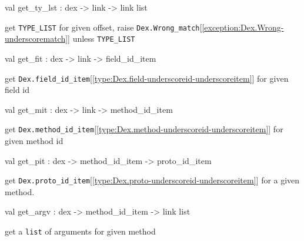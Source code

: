 \documentclass[11pt]{article}
\begin{document}
\label{val:Dex.get-underscorety-underscorelst}\begin{ocamldoccode}
val get_ty_lst : dex -> link -> link list
\end{ocamldoccode}
\begin{ocamldocdescription}
get {\tt{TYPE\_LIST}} for given offset,
 raise {\tt{Dex.Wrong\_match}}[\ref{exception:Dex.Wrong-underscorematch}] unless {\tt{TYPE\_LIST}}


\end{ocamldocdescription}




\label{val:Dex.get-underscorefit}\begin{ocamldoccode}
val get_fit : dex -> link -> field_id_item
\end{ocamldoccode}
\begin{ocamldocdescription}
get {\tt{Dex.field\_id\_item}}[\ref{type:Dex.field-underscoreid-underscoreitem}] for given field id


\end{ocamldocdescription}




\label{val:Dex.get-underscoremit}\begin{ocamldoccode}
val get_mit : dex -> link -> method_id_item
\end{ocamldoccode}
\begin{ocamldocdescription}
get {\tt{Dex.method\_id\_item}}[\ref{type:Dex.method-underscoreid-underscoreitem}] for given method id


\end{ocamldocdescription}




\label{val:Dex.get-underscorepit}\begin{ocamldoccode}
val get_pit : dex -> method_id_item -> proto_id_item
\end{ocamldoccode}
\begin{ocamldocdescription}
get {\tt{Dex.proto\_id\_item}}[\ref{type:Dex.proto-underscoreid-underscoreitem}] for a given method.


\end{ocamldocdescription}




\label{val:Dex.get-underscoreargv}\begin{ocamldoccode}
val get_argv : dex -> method_id_item -> link list
\end{ocamldoccode}
\begin{ocamldocdescription}
get a {\tt{list}} of arguments for given method


\end{ocamldocdescription}
\end{document}
